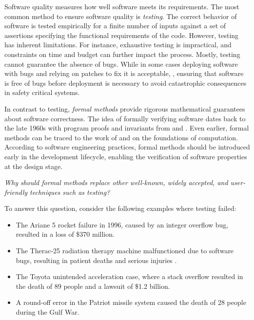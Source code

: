 Software quality measures how well software meets its requirements.
The most common method to ensure software quality is \emph{testing}.
The correct behavior of software is tested empirically for a finite number of inputs against a set of assertions specifying the functional requirements of the code.
However, testing has inherent limitations. For instance,
exhaustive testing is impractical, and constraints on time and budget can further impact the process.
Mostly, testing cannot guarantee the absence of bugs. 
While in some cases deploying software with bugs and relying on patches to fix it is acceptable, \cf{} , ensuring that software is free of bugs before deployment is necessary to avoid catastrophic consequences in safety critical systems.

In contrast to testing, \emph{formal methods} provide rigorous mathematical guarantees about software correctness.
The idea of formally verifying software dates back to the late 1960s with program proofs and invariants from  and .
Even earlier, formal methods can be traced to the work of  and  on the foundations of computation.
According to software engineering practices, formal methods should be introduced early in the development lifecycle, enabling the verification of software properties at the design stage.

\begin{center}\em
  Why should formal methods replace other well-known, widely accepted, and user-friendly techniques such as testing?
\end{center}

To answer this question, consider the following examples where testing failed:

\begin{itemize}
\item The Ariane 5 rocket failure in 1996, caused by an integer overflow bug, resulted in a loss of \$370 million.
\item The Therac-25 radiation therapy machine malfunctioned due to software bugs, resulting in patient deaths and serious injuries .
\item The Toyota unintended acceleration case, where a stack overflow resulted in the death of 89 people and a lawsuit of \$1.2 billion.
\item A round-off error in the Patriot missile system caused the death of 28 people during the Gulf War.
\end{itemize}

